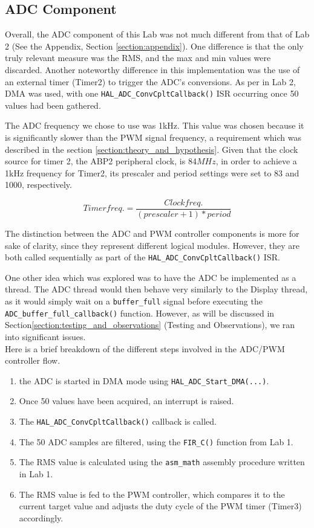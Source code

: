 \subsection{ADC Component}

Overall, the ADC component of this Lab was not much different from that of Lab 2 (See the Appendix, Section \ref{section:appendix}). One difference is that the only truly relevant measure was the RMS, and the max and min values were discarded. Another noteworthy difference in this implementation was the use of an external timer (Timer2) to trigger the ADC's conversions. As per in Lab 2, DMA was used, with one \verb|HAL_ADC_ConvCpltCallback()| ISR occurring once 50 values had been gathered.


The ADC frequency we chose to use was 1kHz. This value was chosen because it is significantly slower than the PWM signal frequency, a requirement which was described in the section \ref{section:theory_and_hypothesis}. Given that the clock source for timer 2, the ABP2 peripheral clock, is 84\(MHz\), in order to achieve a 1kHz frequency for Timer2, its prescaler and period settings were set to 83 and 1000, respectively. 

\begin{equation}
\label{equation:timer_frequency}
 Timer freq. = \frac{Clock freq.}{(prescaler + 1) * period}
\end{equation}

The distinction between the ADC and PWM controller components is more for sake of clarity, since they represent different logical modules. However, they are both called sequentially as part of the \verb|HAL_ADC_ConvCpltCallback()| ISR. 



One other idea which was explored was to have the ADC be implemented as a thread. The ADC thread would then behave very similarly to the Display thread, as it would simply wait on a \verb|buffer_full| signal before executing the \verb|ADC_buffer_full_callback()| function. However, as will be discussed in Section\ref{section:testing_and_observations} (Testing and Observations), we ran into significant issues.\\



Here is a brief breakdown of the different steps involved in the ADC/PWM controller  flow.
\begin{enumerate}
\item the ADC is started in DMA mode using \verb|HAL_ADC_Start_DMA(...)|.
\item Once 50 values have been acquired, an interrupt is raised.
\item The \verb|HAL_ADC_ConvCpltCallback()| callback is called.
\item The 50 ADC samples are filtered, using the \verb|FIR_C()| function from Lab 1.
\item The RMS value is calculated using the \verb|asm_math| assembly procedure written in Lab 1.
\item The RMS value is fed to the PWM controller, which compares it to the current target value and adjusts the duty cycle of the PWM timer (Timer3) accordingly.
\end{enumerate}


